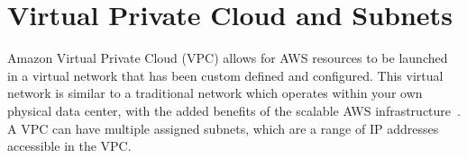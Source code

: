 \chapter{Virtual Private Cloud and Subnets}\label{ch:vpc-subnets}

Amazon Virtual Private Cloud (VPC) allows for AWS resources to be launched in a virtual network that has been custom
defined and configured.
This virtual network is similar to a traditional network which operates within your own physical data center, with the
added benefits of the scalable AWS infrastructure~\parencite{amazon2022what}.
A VPC can have multiple assigned subnets, which are a range of IP addresses accessible in the VPC\@.
